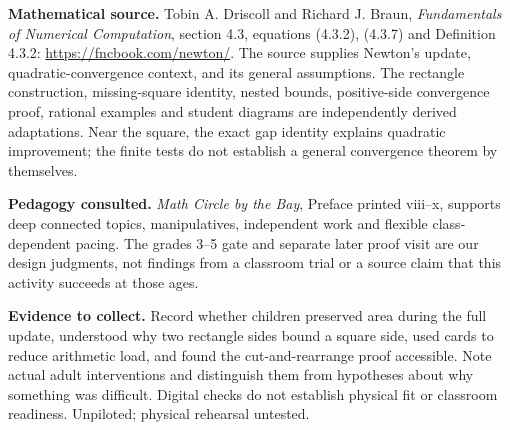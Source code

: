 \documentclass[11pt,letterpaper]{article}
\begin{document}
\textbf{Mathematical source.} Tobin A. Driscoll and Richard J. Braun, \emph{Fundamentals of Numerical Computation}, section 4.3, equations (4.3.2), (4.3.7) and Definition 4.3.2:
\url{https://fncbook.com/newton/}.
The source supplies Newton's update, quadratic-convergence context, and its general assumptions. The rectangle construction, missing-square identity, nested bounds, positive-side convergence proof, rational examples and student diagrams are independently derived adaptations. Near the square, the exact gap identity explains quadratic improvement; the finite tests do not establish a general convergence theorem by themselves.

\textbf{Pedagogy consulted.} \emph{Math Circle by the Bay}, Preface printed viii--x, supports deep connected topics, manipulatives, independent work and flexible class-dependent pacing. The grades 3--5 gate and separate later proof visit are our design judgments, not findings from a classroom trial or a source claim that this activity succeeds at those ages.

\textbf{Evidence to collect.} Record whether children preserved area during the full update, understood why two rectangle sides bound a square side, used cards to reduce arithmetic load, and found the cut-and-rearrange proof accessible. Note actual adult interventions and distinguish them from hypotheses about why something was difficult. Digital checks do not establish physical fit or classroom readiness. Unpiloted; physical rehearsal untested.
\end{document}
